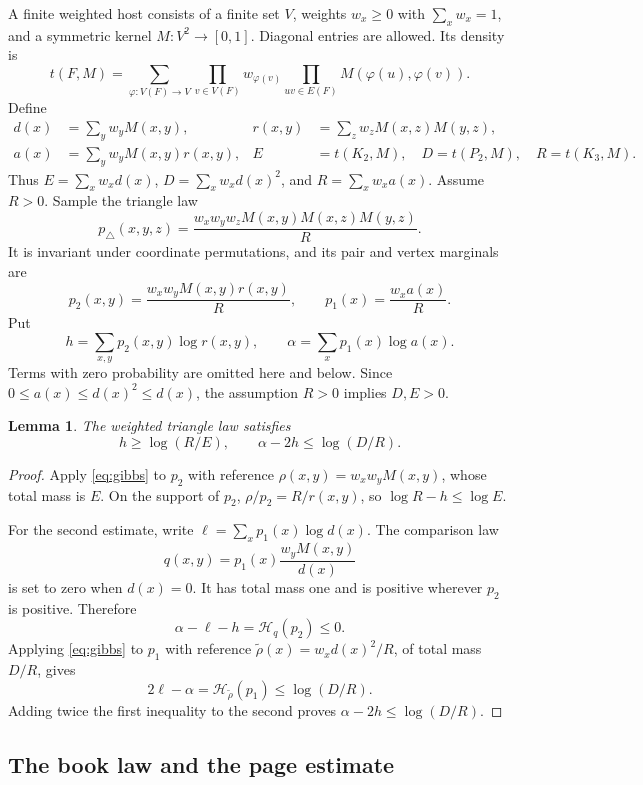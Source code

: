 \documentclass[11pt,a4paper]{article}
\newtheorem{lemma}[theorem]{Lemma}
\theoremstyle{remark}
\numberwithin{equation}{section}
\begin{document}
A finite weighted host consists of a finite set $V$, weights
$w_x\geq0$ with $\sum_xw_x=1$, and a symmetric kernel
$M:V^2\to[0,1]$. Diagonal entries are allowed. Its density is
\[
 t(F,M)=\sum_{\varphi:V(F)\to V}
         \prod_{v\in V(F)}w_{\varphi(v)}
         \prod_{uv\in E(F)}M(\varphi(u),\varphi(v)).
\]
Define
\begin{align*}
 d(x)&=\sum_yw_yM(x,y),&
 r(x,y)&=\sum_zw_zM(x,z)M(y,z),\\
 a(x)&=\sum_yw_yM(x,y)r(x,y),&
 E&=t(K_2,M),\quad D=t(P_2,M),\quad R=t(K_3,M).
\end{align*}
Thus $E=\sum_xw_xd(x)$, $D=\sum_xw_xd(x)^2$, and
$R=\sum_xw_xa(x)$. Assume $R>0$. Sample the triangle law
\[
 p_\triangle(x,y,z)
   =\frac{w_xw_yw_zM(x,y)M(x,z)M(y,z)}{R}.
\]
It is invariant under coordinate permutations, and its pair and
vertex marginals are
\[
 p_2(x,y)=\frac{w_xw_yM(x,y)r(x,y)}{R},\qquad
 p_1(x)=\frac{w_xa(x)}{R}.
\]
Put
\[
 h=\sum_{x,y}p_2(x,y)\log r(x,y),\qquad
 \alpha=\sum_xp_1(x)\log a(x).
\]
Terms with zero probability are omitted here and below.
Since $0\leq a(x)\leq d(x)^2\leq d(x)$, the assumption
$R>0$ implies $D,E>0$.

\begin{lemma}\label{lem:triangle}
The weighted triangle law satisfies
\begin{equation}\label{eq:triangle-estimates}
 h\geq\log(R/E),\qquad \alpha-2h\leq\log(D/R).
\end{equation}
\end{lemma}
\begin{proof}
Apply \eqref{eq:gibbs} to $p_2$ with reference
$\rho(x,y)=w_xw_yM(x,y)$, whose total mass is $E$.
On the support of $p_2$, $\rho/p_2=R/r(x,y)$, so
$\log R-h\leq\log E$.

For the second estimate, write
$\ell=\sum_xp_1(x)\log d(x)$. The comparison law
\[
 q(x,y)=p_1(x)\frac{w_yM(x,y)}{d(x)}
\]
is set to zero when $d(x)=0$. It has total mass one and is
positive wherever $p_2$ is positive. Therefore
\[
 \alpha-\ell-h=\mathcal H_q(p_2)\leq0.
\]
Applying \eqref{eq:gibbs} to $p_1$ with reference
$\widetilde\rho(x)=w_xd(x)^2/R$, of total mass $D/R$, gives
\[
 2\ell-\alpha=\mathcal H_{\widetilde\rho}(p_1)
                    \leq\log(D/R).
\]
Adding twice the first inequality to the second proves
$\alpha-2h\leq\log(D/R)$.
\end{proof}

\subsection{The book law and the page estimate}
\end{document}
